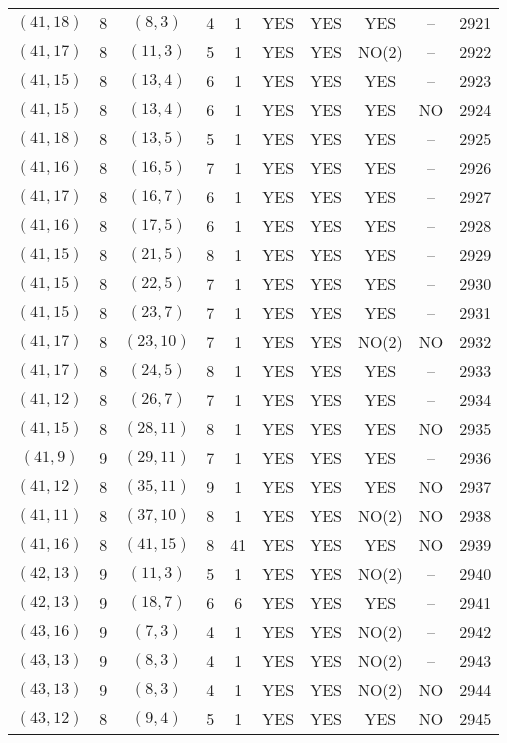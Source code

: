 \begin{longtable}{|c|c|c|c|c|c|c|c|c|c|}
$(41, 18)$ & 8 & $(8, 3)$ & 4 & 1 & YES & YES & YES & -- & 2921\\
$(41, 17)$ & 8 & $(11, 3)$ & 5 & 1 & YES & YES & NO(2) & -- & 2922\\
$(41, 15)$ & 8 & $(13, 4)$ & 6 & 1 & YES & YES & YES & -- & 2923\\
$(41, 15)$ & 8 & $(13, 4)$ & 6 & 1 & YES & YES & YES & NO & 2924\\
$(41, 18)$ & 8 & $(13, 5)$ & 5 & 1 & YES & YES & YES & -- & 2925\\
$(41, 16)$ & 8 & $(16, 5)$ & 7 & 1 & YES & YES & YES & -- & 2926\\
$(41, 17)$ & 8 & $(16, 7)$ & 6 & 1 & YES & YES & YES & -- & 2927\\
$(41, 16)$ & 8 & $(17, 5)$ & 6 & 1 & YES & YES & YES & -- & 2928\\
$(41, 15)$ & 8 & $(21, 5)$ & 8 & 1 & YES & YES & YES & -- & 2929\\
$(41, 15)$ & 8 & $(22, 5)$ & 7 & 1 & YES & YES & YES & -- & 2930\\
$(41, 15)$ & 8 & $(23, 7)$ & 7 & 1 & YES & YES & YES & -- & 2931\\
$(41, 17)$ & 8 & $(23, 10)$ & 7 & 1 & YES & YES & NO(2) & NO & 2932\\
$(41, 17)$ & 8 & $(24, 5)$ & 8 & 1 & YES & YES & YES & -- & 2933\\
$(41, 12)$ & 8 & $(26, 7)$ & 7 & 1 & YES & YES & YES & -- & 2934\\
$(41, 15)$ & 8 & $(28, 11)$ & 8 & 1 & YES & YES & YES & NO & 2935\\
$(41, 9)$ & 9 & $(29, 11)$ & 7 & 1 & YES & YES & YES & -- & 2936\\
$(41, 12)$ & 8 & $(35, 11)$ & 9 & 1 & YES & YES & YES & NO & 2937\\
$(41, 11)$ & 8 & $(37, 10)$ & 8 & 1 & YES & YES & NO(2) & NO & 2938\\
$(41, 16)$ & 8 & $(41, 15)$ & 8 & 41 & YES & YES & YES & NO & 2939\\
$(42, 13)$ & 9 & $(11, 3)$ & 5 & 1 & YES & YES & NO(2) & -- & 2940\\
$(42, 13)$ & 9 & $(18, 7)$ & 6 & 6 & YES & YES & YES & -- & 2941\\
$(43, 16)$ & 9 & $(7, 3)$ & 4 & 1 & YES & YES & NO(2) & -- & 2942\\
$(43, 13)$ & 9 & $(8, 3)$ & 4 & 1 & YES & YES & NO(2) & -- & 2943\\
$(43, 13)$ & 9 & $(8, 3)$ & 4 & 1 & YES & YES & NO(2) & NO & 2944\\
$(43, 12)$ & 8 & $(9, 4)$ & 5 & 1 & YES & YES & YES & NO & 2945\\

\end{longtable}
